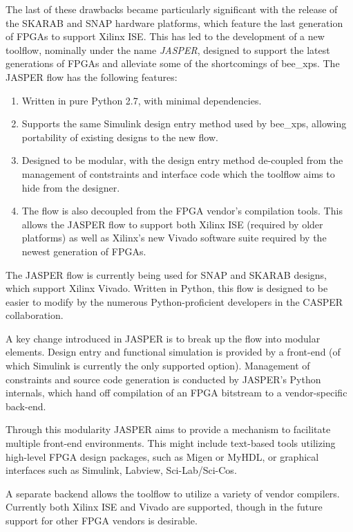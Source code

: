 \documentclass{ws-jai}
\begin{document}
The last of these drawbacks became particularly significant with the release of the SKARAB and SNAP hardware platforms, which feature the last generation of FPGAs to support Xilinx ISE. This has led to the development of a new toolflow, nominally under the name \emph{JASPER}, designed to support the latest generations of FPGAs and alleviate some of the shortcomings of bee\_xps.
The JASPER flow has the following features:
\begin{enumerate}
 \item Written in pure Python 2.7, with minimal dependencies.
 \item Supports the same Simulink design entry method used by bee\_xps, allowing portability of existing designs to the new flow.
 \item Designed to be modular, with the design entry method de-coupled from the management of contstraints and interface code which the toolflow aims to hide from the designer.
 \item The flow is also decoupled from the FPGA vendor's compilation tools. This allows the JASPER flow to support both Xilinx ISE (required by older platforms) as well as Xilinx's new Vivado software suite required by the newest generation of FPGAs.
\end{enumerate}

The JASPER flow is currently being used for SNAP and SKARAB designs, which support Xilinx Vivado. Written in Python, this flow is designed to be easier to modify by the numerous Python-proficient developers in the CASPER collaboration.

A key change introduced in JASPER is to break up the flow into modular elements. Design entry and functional simulation is provided by a front-end (of which Simulink is currently the only supported option). Management of constraints and source code generation is conducted by JASPER's Python internals, which hand off compilation of an FPGA bitstream to a vendor-specific back-end.
 
Through this modularity JASPER aims to provide a mechanism to facilitate multiple front-end environments. This might include text-based tools utilizing high-level FPGA design packages, such as Migen or MyHDL, or graphical interfaces such as Simulink, Labview, Sci-Lab/Sci-Cos.

A separate backend allows the toolflow to utilize a variety of vendor compilers. Currently both Xilinx ISE and Vivado are supported, though in the future support for other FPGA vendors is desirable.
\end{document}
